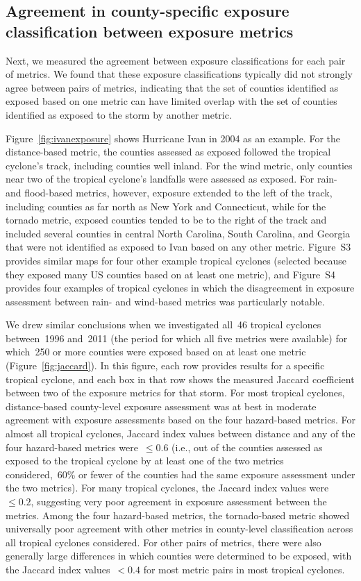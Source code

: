 \subsection*{Agreement in county-specific exposure classification between exposure metrics}

Next, we measured the agreement between exposure classifications for each pair
of metrics. We found that these exposure classifications typically did not
strongly agree between pairs of metrics, indicating that the set of counties
identified as exposed based on one metric can have limited overlap with the
set of counties identified as exposed to the storm by another metric. 

Figure~\ref{fig:ivanexposure} shows Hurricane Ivan in 2004 as an example. For
the distance-based metric, the counties assessed as exposed followed the
tropical cyclone's track, including counties well inland. For the wind metric,
only counties near two of the tropical cyclone's landfalls were assessed as
exposed. For rain- and flood-based metrics, however, exposure extended to the
left of the track, including counties as far north as New York and Connecticut,
while for the tornado metric, exposed counties tended to be to the right of the
track and included several counties in central North Carolina, South Carolina,
and Georgia that were not identified as exposed to Ivan based on any other
metric. Figure~S3 provides similar maps for four other example tropical
cyclones (selected because they exposed many \ac{US}  counties based on at
least one metric), and Figure~S4 provides four examples of tropical cyclones in
which the disagreement in exposure assessment between rain- and wind-based
metrics was particularly notable.

We drew similar conclusions when we investigated all~46 tropical cyclones
between~1996 and~2011 (the period for which all five metrics were available)
for which~250 or more counties were exposed based on at least one metric
(Figure~\ref{fig:jaccard}). In this figure, each row provides results for a
specific tropical cyclone, and each box in that row shows the measured Jaccard
coefficient between two of the exposure metrics for that storm.  For most
tropical cyclones, distance-based county-level exposure assessment was at best
in moderate agreement with exposure assessments based on the four hazard-based
metrics. For almost all tropical cyclones, Jaccard index values between
distance and any of the four hazard-based metrics were~$\le0.6$ (i.e., out of
the counties assessed as exposed to the tropical cyclone by at least one of the
two metrics considered,~60\si{\percent} or fewer of the counties had the same
exposure assessment under the two metrics). For many tropical cyclones, the
Jaccard index values were~$\le0.2$, suggesting very poor agreement in exposure
assessment between the metrics.  Among the four hazard-based metrics, the
tornado-based metric showed universally poor agreement with other metrics in
county-level classification across all tropical cyclones considered.  For other
pairs of metrics, there were also generally large differences in which counties
were determined to be exposed, with the Jaccard index values~$<0.4$ for most
metric pairs in most tropical cyclones.

